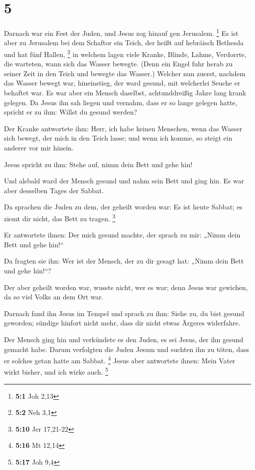 \hypertarget{section-4}{%
\section{5}\label{section-4}}

 Darnach war ein Fest der Juden, und Jesus zog hinauf gen
Jerusalem. \footnote{\textbf{5:1} Joh 2,13}  Es ist aber
zu Jerusalem bei dem Schaftor ein Teich, der heißt auf hebräisch
Bethesda und hat fünf Hallen, \footnote{\textbf{5:2} Neh 3,1}
 in welchem lagen viele Kranke, Blinde, Lahme, Verdorrte,
die warteten, wann sich das Wasser bewegte.  (Denn ein
Engel fuhr herab zu seiner Zeit in den Teich und bewegte das Wasser.)
Welcher nun zuerst, nachdem das Wasser bewegt war, hineinstieg, der ward
gesund, mit welcherlei Seuche er behaftet war.  Es war
aber ein Mensch daselbst, achtunddreißig Jahre lang krank gelegen.
 Da Jesus ihn sah liegen und vernahm, dass er so lange
gelegen hatte, spricht er zu ihm: Willst du gesund werden?

 Der Kranke antwortete ihm: Herr, ich habe keinen
Menschen, wenn das Wasser sich bewegt, der mich in den Teich lasse; und
wenn ich komme, so steigt ein anderer vor mir hinein.

 Jesus spricht zu ihm: Stehe auf, nimm dein Bett und gehe
hin!

 Und alsbald ward der Mensch gesund und nahm sein Bett und
ging hin. Es war aber desselben Tages der Sabbat.

 Da sprachen die Juden zu dem, der geheilt worden war: Es
ist heute Sabbat; es ziemt dir nicht, das Bett zu tragen. \footnote{\textbf{5:10}
  Jer 17,21-22}

 Er antwortete ihnen: Der mich gesund machte, der sprach
zu mir: „Nimm dein Bett und gehe hin!{}``

 Da fragten sie ihn: Wer ist der Mensch, der zu dir
gesagt hat: „Nimm dein Bett und gehe hin!{}``?

 Der aber geheilt worden war, wusste nicht, wer es war;
denn Jesus war gewichen, da so viel Volks an dem Ort war.

 Darnach fand ihn Jesus im Tempel und sprach zu ihm:
Siehe zu, du bist gesund geworden; sündige hinfort nicht mehr, dass dir
nicht etwas Ärgeres widerfahre.

 Der Mensch ging hin und verkündete es den Juden, es sei
Jesus, der ihn gesund gemacht habe.  Darum verfolgten die
Juden Jesum und suchten ihn zu töten, dass er solches getan hatte am
Sabbat. \footnote{\textbf{5:16} Mt 12,14}  Jesus aber
antwortete ihnen: Mein Vater wirkt bisher, und ich wirke auch.
\footnote{\textbf{5:17} Joh 9,4}


